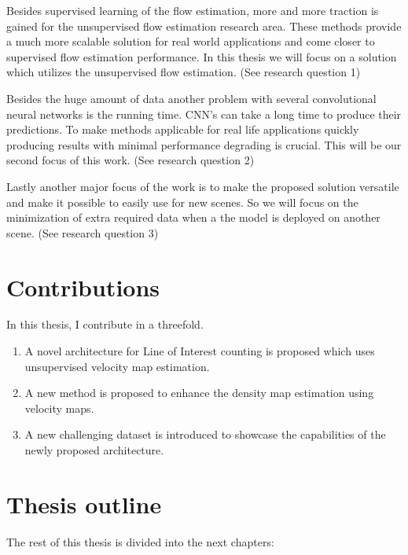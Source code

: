 Besides supervised learning of the flow estimation, more and more traction is gained for the unsupervised flow estimation research area. These methods provide a much more scalable solution for real world applications and come closer to supervised flow estimation performance. In this thesis we will focus on a solution which utilizes the unsupervised flow estimation. (See research question 1)

Besides the huge amount of data another problem with several convolutional neural networks is the running time. CNN’s can take a long time to produce their predictions. To make methods applicable for real life applications quickly producing results with minimal performance degrading is crucial. This will be our second focus of this work. (See research question 2)

Lastly another major focus of the work is to make the proposed solution versatile and make it possible to easily use for new scenes. So we will focus on the minimization of extra required data when a the model is deployed on another scene. (See research question 3)

\section{Contributions}
In this thesis, I contribute in a threefold.
\begin{enumerate}
	\item A novel architecture for Line of Interest counting is proposed which uses unsupervised velocity map estimation. 
	\item A new method is proposed to enhance the density map estimation using velocity maps. 
	\item A new challenging dataset is introduced to showcase the capabilities of the newly proposed architecture.
\end{enumerate}



\section{Thesis outline}
The rest of this thesis is divided into the next chapters:


